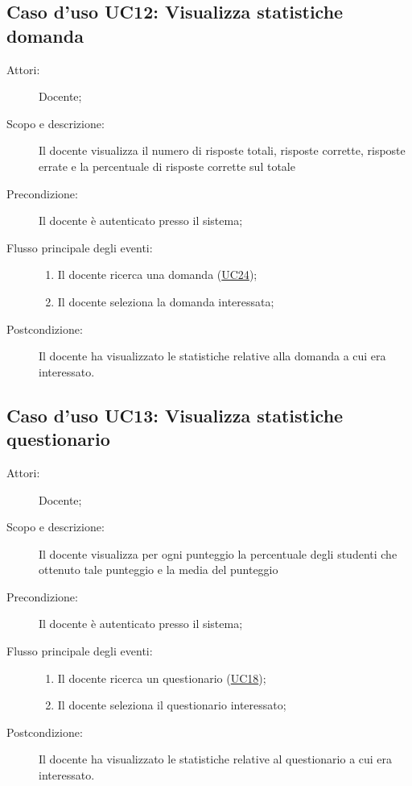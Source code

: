\subsection{Caso d'uso UC12: Visualizza statistiche domanda}\begin{description}
\item[Attori:] Docente;
\item[Scopo e descrizione:] Il docente visualizza il numero di risposte totali, risposte corrette, risposte errate e la percentuale di risposte corrette sul totale
      \item[Precondizione:] Il docente è autenticato presso il sistema;

        \item[Flusso principale degli eventi:] \begin{enumerate}
          \item Il docente ricerca una domanda (\hyperlink{UC24}{UC24});
          \item Il docente seleziona la domanda interessata;

      \end{enumerate}
    \item[Postcondizione:] Il docente ha visualizzato le statistiche relative alla domanda a cui era interessato.
  \end{description}
\hypertarget{UC13}{}
\subsection{Caso d'uso UC13: Visualizza statistiche questionario}\begin{description}
\item[Attori:] Docente;
\item[Scopo e descrizione:] Il docente visualizza per ogni punteggio la percentuale degli studenti che ottenuto tale punteggio e la media del punteggio
      \item[Precondizione:] Il docente è autenticato presso il sistema;

        \item[Flusso principale degli eventi:] \begin{enumerate}
          \item Il docente ricerca un questionario (\hyperlink{UC18}{UC18});
          \item Il docente seleziona il questionario interessato;

      \end{enumerate}
    \item[Postcondizione:] Il docente ha visualizzato le statistiche relative al questionario a cui era interessato.
  \end{description}
\hypertarget{UC14}{}
